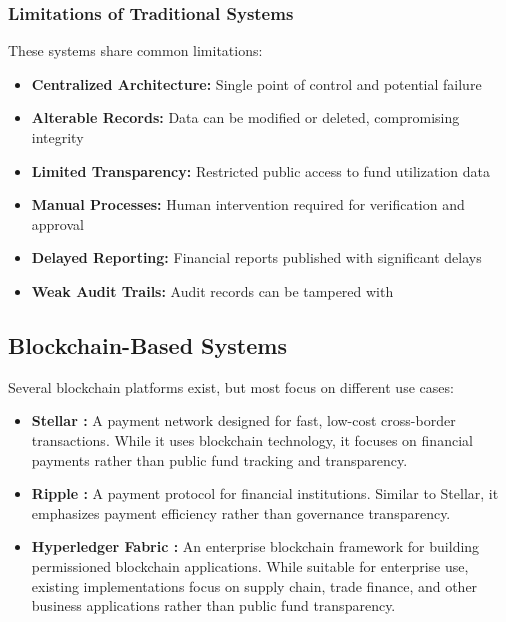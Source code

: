 \documentclass[12pt,a4wide]{report}
\theoremstyle{plain}
\theoremstyle{definition}
\theoremstyle{remark}
\begin{document}
\subsubsection{Limitations of Traditional Systems}

These systems share common limitations:
\begin{itemize}
    \item \textbf{Centralized Architecture:} Single point of control and potential failure
    \item \textbf{Alterable Records:} Data can be modified or deleted, compromising integrity
    \item \textbf{Limited Transparency:} Restricted public access to fund utilization data
    \item \textbf{Manual Processes:} Human intervention required for verification and approval
    \item \textbf{Delayed Reporting:} Financial reports published with significant delays
    \item \textbf{Weak Audit Trails:} Audit records can be tampered with
\end{itemize}

\subsection{Blockchain-Based Systems}

Several blockchain platforms exist, but most focus on different use cases:

\begin{itemize}
    \item \textbf{Stellar \cite{stellar2014}:} A payment network designed for fast, low-cost cross-border transactions. While it uses blockchain technology, it focuses on financial payments rather than public fund tracking and transparency.
    
    \item \textbf{Ripple \cite{ripple2012}:} A payment protocol for financial institutions. Similar to Stellar, it emphasizes payment efficiency rather than governance transparency.
    
    \item \textbf{Hyperledger Fabric \cite{hyperledger2016}:} An enterprise blockchain framework for building permissioned blockchain applications. While suitable for enterprise use, existing implementations focus on supply chain, trade finance, and other business applications rather than public fund transparency.
\end{itemize}
\end{document}
